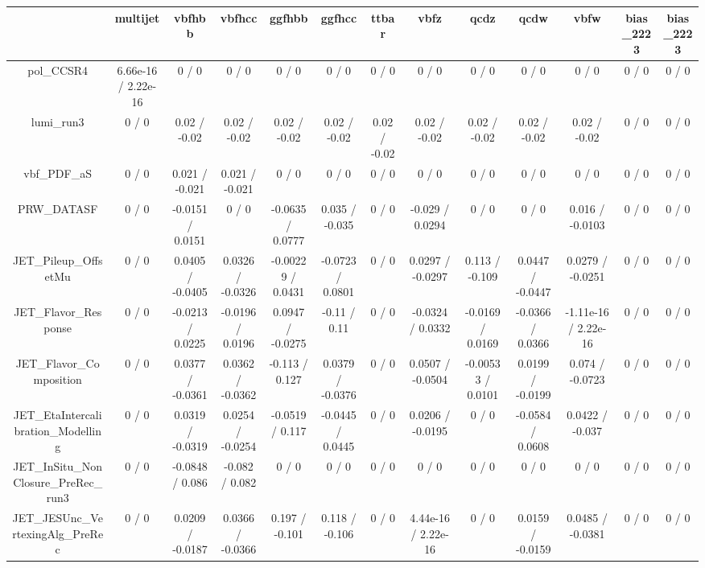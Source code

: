 \documentclass[10pt]{article}
\begin{document}
\begin{table}[htbp]
\begin{center}
\begin{tabular}{|c|c|c|c|c|c|c|c|c|c|c|c|c|}
\hline 
      & multijet      & vbfhbb      & vbfhcc      & ggfhbb      & ggfhcc      & ttbar      & vbfz      & qcdz      & qcdw      & vbfw      & bias_2223      & bias_2223 \\ 
\hline 
  pol_CCSR4 & 6.66e-16 / 2.22e-16 & 0 / 0 & 0 / 0 & 0 / 0 & 0 / 0 & 0 / 0 & 0 / 0 & 0 / 0 & 0 / 0 & 0 / 0 & 0 / 0 & 0 / 0 \\ 
  lumi_run3 & 0 / 0 & 0.02 / -0.02 & 0.02 / -0.02 & 0.02 / -0.02 & 0.02 / -0.02 & 0.02 / -0.02 & 0.02 / -0.02 & 0.02 / -0.02 & 0.02 / -0.02 & 0.02 / -0.02 & 0 / 0 & 0 / 0 \\ 
  vbf_PDF_aS & 0 / 0 & 0.021 / -0.021 & 0.021 / -0.021 & 0 / 0 & 0 / 0 & 0 / 0 & 0 / 0 & 0 / 0 & 0 / 0 & 0 / 0 & 0 / 0 & 0 / 0 \\ 
  PRW_DATASF & 0 / 0 & -0.0151 / 0.0151 & 0 / 0 & -0.0635 / 0.0777 & 0.035 / -0.035 & 0 / 0 & -0.029 / 0.0294 & 0 / 0 & 0 / 0 & 0.016 / -0.0103 & 0 / 0 & 0 / 0 \\ 
  JET_Pileup_OffsetMu & 0 / 0 & 0.0405 / -0.0405 & 0.0326 / -0.0326 & -0.00229 / 0.0431 & -0.0723 / 0.0801 & 0 / 0 & 0.0297 / -0.0297 & 0.113 / -0.109 & 0.0447 / -0.0447 & 0.0279 / -0.0251 & 0 / 0 & 0 / 0 \\ 
  JET_Flavor_Response & 0 / 0 & -0.0213 / 0.0225 & -0.0196 / 0.0196 & 0.0947 / -0.0275 & -0.11 / 0.11 & 0 / 0 & -0.0324 / 0.0332 & -0.0169 / 0.0169 & -0.0366 / 0.0366 & -1.11e-16 / 2.22e-16 & 0 / 0 & 0 / 0 \\ 
  JET_Flavor_Composition & 0 / 0 & 0.0377 / -0.0361 & 0.0362 / -0.0362 & -0.113 / 0.127 & 0.0379 / -0.0376 & 0 / 0 & 0.0507 / -0.0504 & -0.00533 / 0.0101 & 0.0199 / -0.0199 & 0.074 / -0.0723 & 0 / 0 & 0 / 0 \\ 
  JET_EtaIntercalibration_Modelling & 0 / 0 & 0.0319 / -0.0319 & 0.0254 / -0.0254 & -0.0519 / 0.117 & -0.0445 / 0.0445 & 0 / 0 & 0.0206 / -0.0195 & 0 / 0 & -0.0584 / 0.0608 & 0.0422 / -0.037 & 0 / 0 & 0 / 0 \\ 
  JET_InSitu_NonClosure_PreRec_run3 & 0 / 0 & -0.0848 / 0.086 & -0.082 / 0.082 & 0 / 0 & 0 / 0 & 0 / 0 & 0 / 0 & 0 / 0 & 0 / 0 & 0 / 0 & 0 / 0 & 0 / 0 \\ 
  JET_JESUnc_VertexingAlg_PreRec & 0 / 0 & 0.0209 / -0.0187 & 0.0366 / -0.0366 & 0.197 / -0.101 & 0.118 / -0.106 & 0 / 0 & 4.44e-16 / 2.22e-16 & 0 / 0 & 0.0159 / -0.0159 & 0.0485 / -0.0381 & 0 / 0 & 0 / 0 \\ 

\end{tabular}
\end{center}
\end{table}
\end{document}

